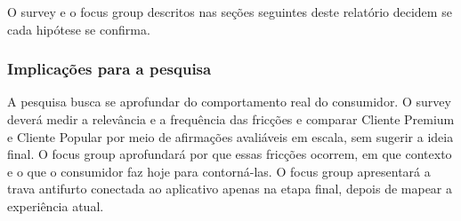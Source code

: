O survey e o focus group descritos nas seções seguintes deste relatório decidem se cada hipótese se confirma.

\subsubsection{Implicações para a pesquisa}
\label{subsubsec:segmentacao_implicacoes}

A pesquisa busca se aprofundar do comportamento real do consumidor. O survey deverá medir a relevância e a frequência das fricções e comparar Cliente Premium e Cliente Popular por meio de afirmações avaliáveis em escala, sem sugerir a ideia final. O focus group aprofundará por que essas fricções ocorrem, em que contexto e o que o consumidor faz hoje para contorná-las. O focus group apresentará a trava antifurto conectada ao aplicativo apenas na etapa final, depois de mapear a experiência atual.
